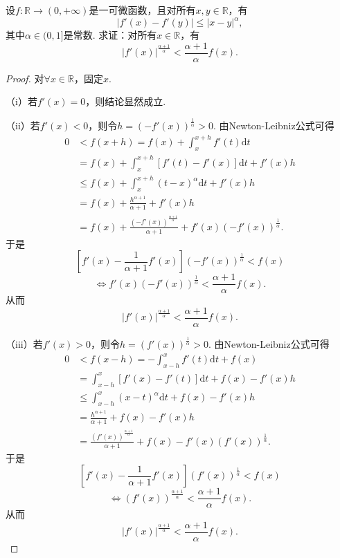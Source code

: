 \documentclass[../../main.tex]{subfiles}
\begin{document}
\begin{example}
设$f: \mathbb{R} \to (0, +\infty)$是一可微函数，且对所有$x, y \in \mathbb{R}$，有
$$|f'(x) - f'(y)| \leq |x - y|^\alpha,$$
其中$\alpha \in (0, 1]$是常数.
求证：对所有$x \in \mathbb{R}$，有
$$|f'(x)|^{\frac{\alpha + 1}{\alpha}} < \frac{\alpha + 1}{\alpha} f(x).$$
\end{example}
\begin{proof}
对$\forall x \in \mathbb{R}$，固定$x$.

（i）若$f'(x) = 0$，则结论显然成立.

（ii）若$f'(x) < 0$，则令$h = \left( -f'(x) \right)^{\frac{1}{\alpha}} > 0$. 由Newton-Leibniz公式可得
\begin{align*}
0 &< f(x + h) = f(x) + \int_x^{x + h} f'(t) \mathrm{d}t \\
&= f(x) + \int_x^{x + h} \left[ f'(t) - f'(x) \right] \mathrm{d}t + f'(x) h \\
&\leq f(x) + \int_x^{x + h} \left( t - x \right)^{\alpha} \mathrm{d}t + f'(x) h \\
&= f(x) + \frac{h^{\alpha + 1}}{\alpha + 1} + f'(x) h \\
&= f(x) + \frac{\left( -f'(x) \right)^{\frac{\alpha + 1}{\alpha}}}{\alpha + 1} + f'(x) \left( -f'(x) \right)^{\frac{1}{\alpha}}.
\end{align*}
于是
$$\left[ f'(x) - \frac{1}{\alpha + 1} f'(x) \right] \left( -f'(x) \right)^{\frac{1}{\alpha}} < f(x)$$
$$\Longleftrightarrow f'(x) \left( -f'(x) \right)^{\frac{1}{\alpha}} < \frac{\alpha + 1}{\alpha} f(x).$$
从而
$$\left| f'(x) \right|^{\frac{\alpha + 1}{\alpha}} < \frac{\alpha + 1}{\alpha} f(x).$$

（iii）若$f'(x) > 0$，则令$h = \left( f'(x) \right)^{\frac{1}{\alpha}} > 0$. 由Newton-Leibniz公式可得
\begin{align*}
0 &< f(x - h) = -\int_{x - h}^x f'(t) \mathrm{d}t + f(x) \\
&= \int_{x - h}^x \left[ f'(x) - f'(t) \right] \mathrm{d}t + f(x) - f'(x) h \\
&\leq \int_{x - h}^x \left( x - t \right)^{\alpha} \mathrm{d}t + f(x) - f'(x) h \\
&= \frac{h^{\alpha + 1}}{\alpha + 1} + f(x) - f'(x) h \\
&= \frac{\left( f'(x) \right)^{\frac{\alpha + 1}{\alpha}}}{\alpha + 1} + f(x) - f'(x) \left( f'(x) \right)^{\frac{1}{\alpha}}.
\end{align*}
于是
$$\left[ f'(x) - \frac{1}{\alpha + 1} f'(x) \right] \left( f'(x) \right)^{\frac{1}{\alpha}} < f(x)$$
$$\Longleftrightarrow \left( f'(x) \right)^{\frac{\alpha + 1}{\alpha}} < \frac{\alpha + 1}{\alpha} f(x).$$
从而
$$\left| f'(x) \right|^{\frac{\alpha + 1}{\alpha}} < \frac{\alpha + 1}{\alpha} f(x).$$

\end{proof}
\end{document}
